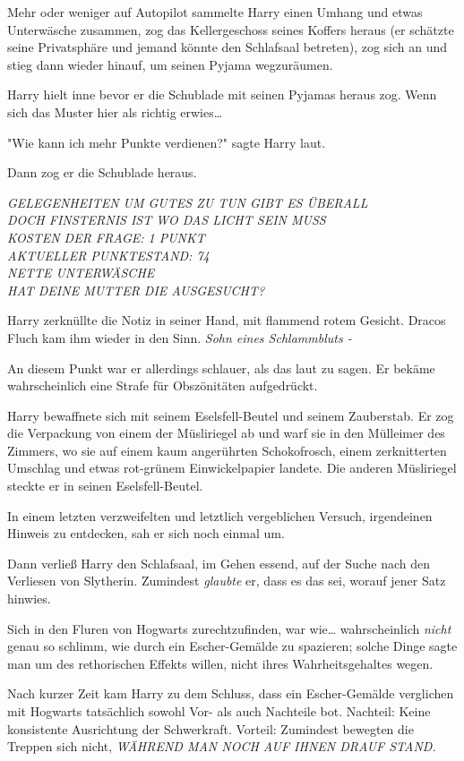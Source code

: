 {Mehr oder weniger auf Autopilot sammelte Harry einen Umhang und etwas Unterwäsche zusammen, zog das Kellergeschoss seines Koffers heraus (er schätzte seine Privatsphäre und jemand könnte den Schlafsaal betreten), zog sich an und stieg dann wieder hinauf, um seinen Pyjama wegzuräumen.

Harry hielt inne bevor er die Schublade mit seinen Pyjamas heraus zog. Wenn sich das Muster hier als richtig erwies…

"Wie kann ich mehr Punkte verdienen?" sagte Harry laut.

Dann zog er die Schublade heraus.

\emph{GELEGENHEITEN UM GUTES ZU TUN GIBT ES ÜBERALL\\ DOCH FINSTERNIS IST WO DAS LICHT SEIN MUSS\\ KOSTEN DER FRAGE: 1 PUNKT\\ AKTUELLER PUNKTESTAND: 74\\ NETTE UNTERWÄSCHE\\ HAT DEINE MUTTER DIE AUSGESUCHT?}

Harry zerknüllte die Notiz in seiner Hand, mit flammend rotem Gesicht. Dracos Fluch kam ihm wieder in den Sinn. \emph{Sohn eines Schlammbluts -}

An diesem Punkt war er allerdings schlauer, als das laut zu sagen. Er bekäme wahrscheinlich eine Strafe für Obszönitäten aufgedrückt.

Harry bewaffnete sich mit seinem Eselsfell-Beutel und seinem Zauberstab. Er zog die Verpackung von einem der Müsliriegel ab und warf sie in den Mülleimer des Zimmers, wo sie auf einem kaum angerührten Schokofrosch, einem zerknitterten Umschlag und etwas rot-grünem Einwickelpapier landete. Die anderen Müsliriegel steckte er in seinen Eselsfell-Beutel.

In einem letzten verzweifelten und letztlich vergeblichen Versuch, irgendeinen Hinweis zu entdecken, sah er sich noch einmal um.

Dann verließ Harry den Schlafsaal, im Gehen essend, auf der Suche nach den Verliesen von Slytherin. Zumindest \emph{glaubte} er, dass es das sei, worauf jener Satz hinwies.

Sich in den Fluren von Hogwarts zurechtzufinden, war wie… wahrscheinlich \emph{nicht} genau so schlimm, wie durch ein Escher-Gemälde zu spazieren; solche Dinge sagte man um des rethorischen Effekts willen, nicht ihres Wahrheitsgehaltes wegen.

Nach kurzer Zeit kam Harry zu dem Schluss, dass ein Escher-Gemälde verglichen mit Hogwarts tatsächlich sowohl Vor- als auch Nachteile bot. Nachteil: Keine konsistente Ausrichtung der Schwerkraft. Vorteil: Zumindest bewegten die Treppen sich nicht, \emph{WÄHREND MAN NOCH AUF IHNEN DRAUF STAND.}

}
